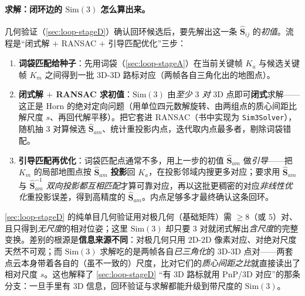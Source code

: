 \paragraph{求解：闭环边的 \texorpdfstring{$\mathrm{Sim}(3)$}{Sim(3)} 怎么算出来。}
几何验证（\cref{sec:loop-stageD}）确认回环候选后，要先解出这一条 $\hat{\mathbf S}_{ij}$ 的\emph{初值}。流程是“闭式解 $+$ RANSAC $+$ 引导匹配优化”三步\cite{murartal2015orbslam,campos2021orbslam3}：
\begin{enumerate}
  \item \textbf{词袋匹配给种子}：先用词袋（\cref{sec:loop-stageA}）在当前关键帧 $K_a$ 与候选关键帧 $K_m$ 之间得到一批 $3$D-$3$D 路标对应（两帧各自三角化出的地图点）。
  \item \textbf{闭式解 $+$ RANSAC 求初值}：$\mathrm{Sim}(3)$ 由\emph{至少 $3$ 对} $3$D 点即可\textbf{闭式}求解——这正是 Horn 的绝对定向问题（用单位四元数解旋转、由两组点的质心间距比解尺度 $s$、再回代解平移）\cite{horn1987closed}。把它套进 RANSAC（书中实现为 \texttt{Sim3Solver}），随机抽 $3$ 对算候选 $\hat{\mathbf S}_{am}$、统计重投影内点，迭代取内点最多者，剔除词袋错配。
  \item \textbf{引导匹配再优化}：词袋匹配点通常不多，用上一步的初值 $\hat{\mathbf S}_{am}$ 做\emph{引导}——把 $K_m$ 的局部地图点按 $\hat{\mathbf S}_{am}$ \textbf{投影}回 $K_a$，在投影邻域内搜更多对应；要求用 $\hat{\mathbf S}_{am}$ 与 $\hat{\mathbf S}_{am}^{-1}$ \emph{双向投影都互相匹配}才算可靠对应，再以这批更稠密的对应\emph{非线性优化}重投影误差，得到高精度的 $\hat{\mathbf S}_{am}$。内点足够多才最终确认这条回环\cite{campos2021orbslam3}。
\end{enumerate}

\begin{insight}\label{ins:loop-sim3-3pt}
\cref{sec:loop-stageD} 的纯单目几何验证用对极几何（基础矩阵）需 $\ge 8$（或 $5$）对、且只得到\emph{无尺度}的相对位姿；这里 $\mathrm{Sim}(3)$ 却只要 $3$ 对就闭式解出\emph{含尺度}的完整变换。差别的根源是\textbf{信息来源不同}：对极几何只用 $2$D-$2$D 像素对应、对绝对尺度天然不可观；而 $\mathrm{Sim}(3)$ 求解吃的是两帧各自\emph{已三角化}的 $3$D-$3$D 点对——两套点云本身带着各自的（虽不一致的）尺度，比对它们的\emph{质心间距之比}就直接读出了相对尺度 $s$\cite{horn1987closed}。这也解释了 \cref{sec:loop-stageD} “有 $3$D 路标就用 PnP/$3$D 对应”的那条分支：一旦手里有 $3$D 信息，回环验证与求解都能升级到带尺度的 $\mathrm{Sim}(3)$。
\end{insight}

